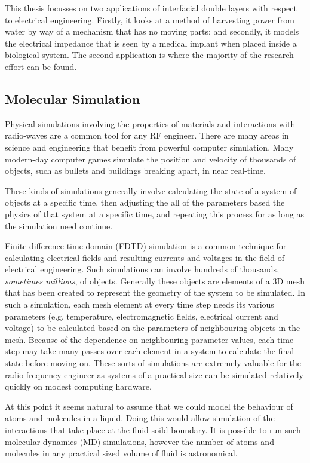     This thesis focusses on two applications of interfacial double layers with respect to electrical engineering. Firstly, it looks at a method of harvesting power from water by way of a mechanism that has no moving parts; and secondly, it models the electrical impedance that is seen by a medical implant when placed inside a biological system. The second application is where the majority of the research effort can be found.

    \subsection{Molecular Simulation}
    Physical simulations involving the properties of materials and interactions with radio-waves are a common tool for any RF engineer. There are many areas in science and engineering that benefit from powerful computer simulation. Many modern-day computer games simulate the position and velocity of thousands of objects, such as bullets and buildings breaking apart, in near real-time.

    These kinds of simulations generally involve calculating the state of a system of objects at a specific time, then adjusting the all of the parameters based the physics of that system at a specific time, and repeating this process for as long as the simulation need continue.

    Finite-difference time-domain (FDTD) simulation is a common technique for calculating electrical fields and resulting currents and voltages in the field of electrical engineering. Such simulations can involve hundreds of thousands, \emph{sometimes millions}, of objects. Generally these objects are elements of a 3D mesh that has been created to represent the geometry of the system to be simulated. In such a simulation, each mesh element at every time step needs its various parameters (e.g. temperature, electromagnetic fields, electrical current and voltage) to be calculated based on the parameters of neighbouring objects in the mesh. Because of the dependence on neighbouring parameter values, each time-step may take many passes over each element in a system to calculate the final state before moving on. These sorts of simulations are extremely valuable for the radio frequency engineer as systems of a practical size can be simulated relatively quickly on modest computing hardware.

    At this point it seems natural to assume that we could model the behaviour of atoms and molecules in a liquid. Doing this would allow simulation of the interactions that take place at the fluid-soild boundary. It is possible to run such molecular dynamics (MD) simulations, however the number of atoms and molecules in any practical sized volume of fluid is astronomical.

